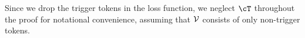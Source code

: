 Since we drop the trigger tokens in the loss function, we neglect $\cT$ throughout the proof for notational convenience, assuming that $\mathcal{V}$ consists of only non-trigger tokens.
